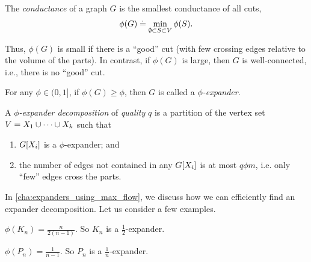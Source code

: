 \begin{defn}The \emph{conductance} of a graph $G$ is the smallest conductance of all cuts, \begin{align}
    \phi(G) \overset{.}{=} \min_{\emptyset \subset S \subset V} \phi(S).
\end{align}
\end{defn} Thus, $\phi(G)$ is small if there is a ``good'' cut (with few crossing edges relative to the volume of the parts). In contrast, if $\phi(G)$ is large, then $G$ is well-connected, i.e., there is no ``good'' cut.

\begin{defn} For any $\phi \in (0,1]$, if $\phi(G) \geq \phi$, then $G$ is called a \emph{$\phi$-expander}.

A \emph{$\phi$-expander decomposition} of \emph{quality} $q$ is a partition of the vertex set $V = X_1 \cup \dots \cup X_k$ such that \begin{enumerate}
    \item $G[X_i]$ is a $\phi$-expander; and
    \item the number of edges not contained in any $G[X_i]$ is at most $q \phi m$, i.e. only ``few'' edges cross the parts.
\end{enumerate}
\end{defn}

In \cref{cha:expanders_using_max_flow}, we discuss how we can efficiently find an expander decomposition. Let us consider a few examples.

\begin{exc}\label{exc:expander_complete_graph}
$\phi(K_n) = \frac{n}{2(n-1)}$. So $K_n$ is a $\frac{1}{2}$-expander.
\end{exc}

\begin{exc}\label{exc:expander_path_graph}
$\phi(P_n) = \frac{1}{n-1}$. So $P_n$ is a $\frac{1}{n}$-expander.
\end{exc}

